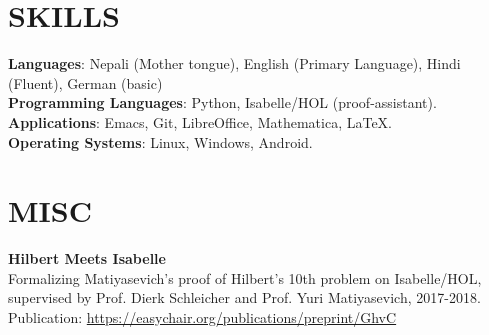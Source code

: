\documentclass[margin]{res}
\begin{document}
\begin{resume}
\section{SKILLS}
\textbf{Languages}: Nepali (Mother tongue), English (Primary Language), Hindi (Fluent), German (basic)\\
\textbf{Programming Languages}: Python, Isabelle/HOL (proof-assistant).
\\
\textbf{Applications}: Emacs, Git, LibreOffice, Mathematica, \LaTeX.
\\
\textbf{Operating Systems}: 
Linux, Windows, Android.

\section{MISC}
\par
\textbf{Hilbert Meets Isabelle}\\ 
Formalizing Matiyasevich's proof of Hilbert's 10th problem on Isabelle/HOL, supervised by Prof. Dierk Schleicher and Prof. Yuri Matiyasevich, 2017-2018. Publication: \url{https://easychair.org/publications/preprint/GhvC}
\end{resume}
\end{document}

